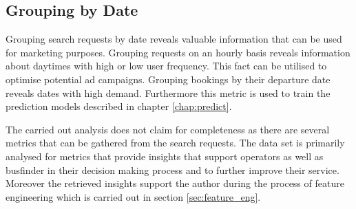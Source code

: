 \subsection{Grouping by Date}
Grouping search requests by date reveals valuable information that can be used for marketing purposes. Grouping requests on an hourly basis reveals information about daytimes with high or low user frequency. This fact can be utilised to optimise potential ad campaigns. Grouping bookings by their departure date reveals dates with high demand. Furthermore this metric is used to train the prediction models described in chapter \ref{chap:predict}. \newline


The carried out analysis does not claim for completeness as there are several metrics that can be gathered from the search requests. The data set is primarily analysed for metrics that provide insights that support operators as well as busfinder in their decision making process and to further improve their service. Moreover the retrieved insights support the author during the process of feature engineering which is carried out in section \ref{sec:feature_eng}.







